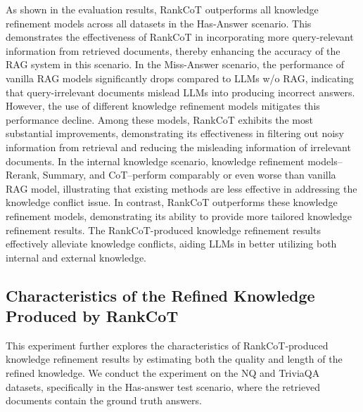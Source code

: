 As shown in the evaluation results, RankCoT outperforms all knowledge refinement models across all datasets in the Has-Answer scenario. This demonstrates the effectiveness of RankCoT in incorporating more query-relevant information from retrieved documents, thereby enhancing the accuracy of the RAG system in this scenario. In the Miss-Answer scenario, the performance of vanilla RAG models significantly drops compared to LLMs w/o RAG, indicating that query-irrelevant documents mislead LLMs into producing incorrect answers. However, the use of different knowledge refinement models mitigates this performance decline. Among these models, RankCoT exhibits the most substantial improvements, demonstrating its effectiveness in filtering out noisy information from retrieval and reducing the misleading information of irrelevant documents. In the internal knowledge scenario, knowledge refinement models--Rerank, Summary, and CoT--perform comparably or even worse than vanilla RAG model, illustrating that existing methods are less effective in addressing the knowledge conflict issue. In contrast, RankCoT outperforms these knowledge refinement models, demonstrating its ability to provide more tailored knowledge refinement results. The RankCoT-produced knowledge refinement results effectively alleviate knowledge conflicts, aiding LLMs in better utilizing both internal and external knowledge.





\subsection{Characteristics of the Refined Knowledge Produced by RankCoT}\label{sec:characteristics}
This experiment further explores the characteristics of RankCoT-produced knowledge refinement results by estimating both the quality and length of the refined knowledge. We conduct the experiment on the NQ and TriviaQA datasets, specifically in the Has-answer test scenario, where the retrieved documents contain the ground truth answers.

